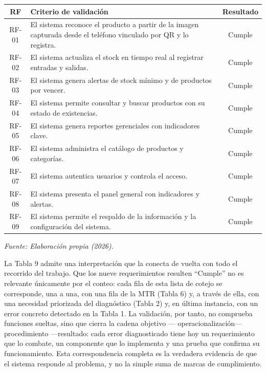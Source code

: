 \documentclass[12pt, letterpaper]{report}
\begin{document}
\begin{center}
\begin{tabular}{|c|>{\raggedright\arraybackslash}p{7.5cm}|c|}
\hline
\textbf{RF} & \textbf{Criterio de validación} & \textbf{Resultado} \\
\hline
RF-01 & El sistema reconoce el producto a partir de la imagen
capturada desde el teléfono vinculado por QR y lo registra. &
Cumple \\
\hline
RF-02 & El sistema actualiza el stock en tiempo real al registrar
entradas y salidas. & Cumple \\
\hline
RF-03 & El sistema genera alertas de stock mínimo y de productos por
vencer. & Cumple \\
\hline
RF-04 & El sistema permite consultar y buscar productos con su estado
de existencias. & Cumple \\
\hline
RF-05 & El sistema genera reportes gerenciales con indicadores
clave. & Cumple \\
\hline
RF-06 & El sistema administra el catálogo de productos y categorías. &
Cumple \\
\hline
RF-07 & El sistema autentica usuarios y controla el acceso. &
Cumple \\
\hline
RF-08 & El sistema presenta el panel general con indicadores y
alertas. & Cumple \\
\hline
RF-09 & El sistema permite el respaldo de la información y la
configuración del sistema. & Cumple \\
\hline
\end{tabular}
\end{center}
\vspace{2pt}
\noindent\small\textit{Fuente: Elaboración propia (2026).}\normalsize
{}

\vspace{6pt}

La Tabla 9 admite una interpretación que la conecta de vuelta con todo
el recorrido del trabajo. Que los nueve requerimientos resulten
``Cumple'' no es relevante únicamente por el conteo: cada fila de esta
lista de cotejo se corresponde, una a una, con una fila de la MTR
(Tabla 6) y, a través de ella, con una necesidad priorizada del
diagnóstico (Tabla 2) y, en última instancia, con un error concreto
detectado en la Tabla 1. La validación, por tanto, no comprueba
funciones sueltas, sino que cierra la cadena objetivo ---
operacionalización--- procedimiento ---resultado: cada error
diagnosticado tiene hoy un requerimiento que lo combate, un componente
que lo implementa y una prueba que confirma su funcionamiento. Esta
correspondencia completa es la verdadera evidencia de que el sistema
responde al problema, y no la simple suma de marcas de cumplimiento.
\end{document}
